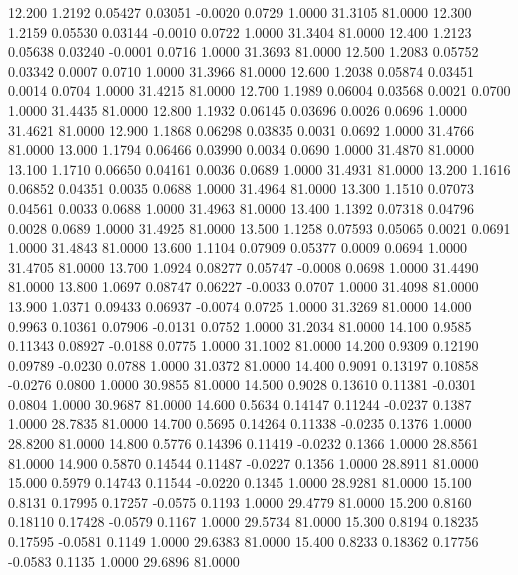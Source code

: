   12.200   1.2192   0.05427   0.03051  -0.0020   0.0729   1.0000  31.3105  81.0000
  12.300   1.2159   0.05530   0.03144  -0.0010   0.0722   1.0000  31.3404  81.0000
  12.400   1.2123   0.05638   0.03240  -0.0001   0.0716   1.0000  31.3693  81.0000
  12.500   1.2083   0.05752   0.03342   0.0007   0.0710   1.0000  31.3966  81.0000
  12.600   1.2038   0.05874   0.03451   0.0014   0.0704   1.0000  31.4215  81.0000
  12.700   1.1989   0.06004   0.03568   0.0021   0.0700   1.0000  31.4435  81.0000
  12.800   1.1932   0.06145   0.03696   0.0026   0.0696   1.0000  31.4621  81.0000
  12.900   1.1868   0.06298   0.03835   0.0031   0.0692   1.0000  31.4766  81.0000
  13.000   1.1794   0.06466   0.03990   0.0034   0.0690   1.0000  31.4870  81.0000
  13.100   1.1710   0.06650   0.04161   0.0036   0.0689   1.0000  31.4931  81.0000
  13.200   1.1616   0.06852   0.04351   0.0035   0.0688   1.0000  31.4964  81.0000
  13.300   1.1510   0.07073   0.04561   0.0033   0.0688   1.0000  31.4963  81.0000
  13.400   1.1392   0.07318   0.04796   0.0028   0.0689   1.0000  31.4925  81.0000
  13.500   1.1258   0.07593   0.05065   0.0021   0.0691   1.0000  31.4843  81.0000
  13.600   1.1104   0.07909   0.05377   0.0009   0.0694   1.0000  31.4705  81.0000
  13.700   1.0924   0.08277   0.05747  -0.0008   0.0698   1.0000  31.4490  81.0000
  13.800   1.0697   0.08747   0.06227  -0.0033   0.0707   1.0000  31.4098  81.0000
  13.900   1.0371   0.09433   0.06937  -0.0074   0.0725   1.0000  31.3269  81.0000
  14.000   0.9963   0.10361   0.07906  -0.0131   0.0752   1.0000  31.2034  81.0000
  14.100   0.9585   0.11343   0.08927  -0.0188   0.0775   1.0000  31.1002  81.0000
  14.200   0.9309   0.12190   0.09789  -0.0230   0.0788   1.0000  31.0372  81.0000
  14.400   0.9091   0.13197   0.10858  -0.0276   0.0800   1.0000  30.9855  81.0000
  14.500   0.9028   0.13610   0.11381  -0.0301   0.0804   1.0000  30.9687  81.0000
  14.600   0.5634   0.14147   0.11244  -0.0237   0.1387   1.0000  28.7835  81.0000
  14.700   0.5695   0.14264   0.11338  -0.0235   0.1376   1.0000  28.8200  81.0000
  14.800   0.5776   0.14396   0.11419  -0.0232   0.1366   1.0000  28.8561  81.0000
  14.900   0.5870   0.14544   0.11487  -0.0227   0.1356   1.0000  28.8911  81.0000
  15.000   0.5979   0.14743   0.11544  -0.0220   0.1345   1.0000  28.9281  81.0000
  15.100   0.8131   0.17995   0.17257  -0.0575   0.1193   1.0000  29.4779  81.0000
  15.200   0.8160   0.18110   0.17428  -0.0579   0.1167   1.0000  29.5734  81.0000
  15.300   0.8194   0.18235   0.17595  -0.0581   0.1149   1.0000  29.6383  81.0000
  15.400   0.8233   0.18362   0.17756  -0.0583   0.1135   1.0000  29.6896  81.0000
